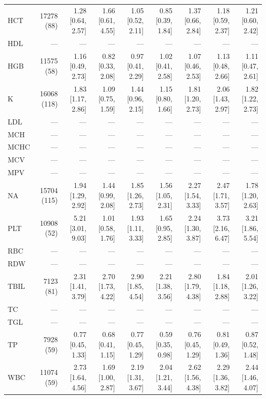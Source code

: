 \begin{table}[ht]
\begin{tabular}{lrrrrrrrr}
HCT & 17278 (88) & 1.28 [0.64, 2.57] & 1.66 [0.61, 4.55] & 1.05 [0.52, 2.11] & 0.85 [0.39, 1.84] & 1.37 [0.66, 2.84] & 1.18 [0.59, 2.37] & 1.21 [0.60, 2.42] \\
HDL & --- & --- & --- & --- & --- & --- & --- & --- \\
HGB & 11575 (58) & 1.16 [0.49, 2.73] & 0.82 [0.33, 2.08] & 0.97 [0.41, 2.29] & 1.02 [0.41, 2.58] & 1.07 [0.46, 2.53] & 1.13 [0.48, 2.66] & 1.11 [0.47, 2.61] \\
K & 16068 (118) & 1.83 [1.17, 2.86] & 1.09 [0.75, 1.59] & 1.44 [0.96, 2.15] & 1.15 [0.80, 1.66] & 1.81 [1.20, 2.73] & 2.06 [1.43, 2.97] & 1.82 [1.22, 2.73] \\
LDL & --- & --- & --- & --- & --- & --- & --- & --- \\
MCH & --- & --- & --- & --- & --- & --- & --- & --- \\
MCHC & --- & --- & --- & --- & --- & --- & --- & --- \\
MCV & --- & --- & --- & --- & --- & --- & --- & --- \\
MPV & --- & --- & --- & --- & --- & --- & --- & --- \\
NA & 15704 (115) & 1.94 [1.29, 2.92] & 1.44 [0.99, 2.08] & 1.85 [1.26, 2.73] & 1.56 [1.05, 2.31] & 2.27 [1.54, 3.33] & 2.47 [1.71, 3.57] & 1.78 [1.20, 2.63] \\
PLT & 10908 (52) & 5.21 [3.01, 9.03] & 1.01 [0.58, 1.76] & 1.93 [1.11, 3.33] & 1.65 [0.95, 2.85] & 2.24 [1.30, 3.87] & 3.73 [2.16, 6.47] & 3.21 [1.86, 5.54] \\
RBC & --- & --- & --- & --- & --- & --- & --- & --- \\
RDW & --- & --- & --- & --- & --- & --- & --- & --- \\
TBIL & 7123 (81) & 2.31 [1.41, 3.79] & 2.70 [1.73, 4.22] & 2.90 [1.85, 4.54] & 2.21 [1.38, 3.56] & 2.80 [1.79, 4.38] & 1.84 [1.18, 2.88] & 2.01 [1.26, 3.22] \\
TC & --- & --- & --- & --- & --- & --- & --- & --- \\
TGL & --- & --- & --- & --- & --- & --- & --- & --- \\
TP & 7928 (59) & 0.77 [0.45, 1.33] & 0.68 [0.41, 1.15] & 0.77 [0.45, 1.29] & 0.59 [0.35, 0.98] & 0.76 [0.45, 1.29] & 0.81 [0.49, 1.36] & 0.87 [0.52, 1.48] \\
WBC & 11074 (59) & 2.73 [1.64, 4.56] & 1.69 [1.00, 2.87] & 2.19 [1.31, 3.67] & 2.04 [1.21, 3.44] & 2.62 [1.56, 4.38] & 2.29 [1.36, 3.82] & 2.44 [1.46, 4.07] \\
\bottomrule
\end{tabular}
\label{tab:13_cox_inspire_unplanned_icu}
\end{table}